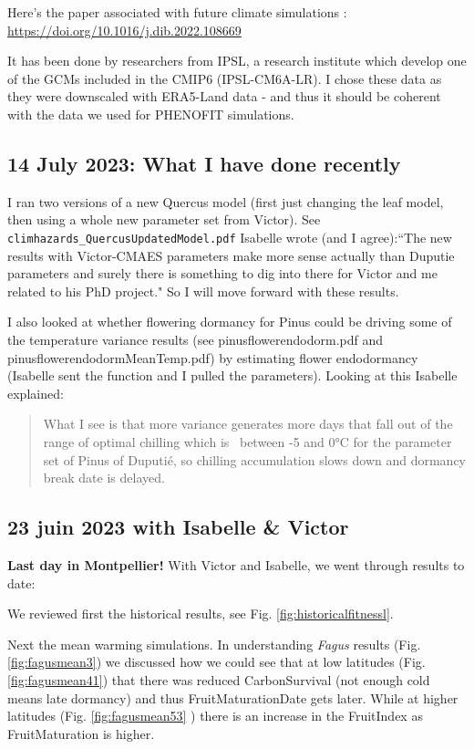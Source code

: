 \documentclass[11pt,letter]{article}
\begin{document}
Here's the paper associated with future climate simulations : \url{https://doi.org/10.1016/j.dib.2022.108669}

It has been done by researchers from IPSL, a research institute which develop one of the GCMs included in the CMIP6 (IPSL-CM6A-LR).
I chose these data as they were downscaled with ERA5-Land data - and thus it should be coherent with the data we used for PHENOFIT simulations.

\subsection{14 July 2023: What I have done recently}
I ran two versions of a new Quercus model (first just changing the leaf model, then using a whole new parameter set from Victor). See \verb|climhazards_QuercusUpdatedModel.pdf| Isabelle wrote (and I agree):``The new results with Victor-CMAES parameters make more sense actually than Duputie parameters and surely there is something to dig into there for Victor and me related to his PhD project." So I will move forward with these results. 

I also looked at whether flowering dormancy for Pinus could be driving some of the temperature variance results (see pinusflowerendodorm.pdf and pinusflowerendodormMeanTemp.pdf) by estimating flower endodormancy (Isabelle sent the function and I pulled the parameters). Looking at this Isabelle explained:

\begin{quote}
What I see is that more variance generates more days that fall out of the range of optimal chilling which is ~between -5 and 0°C for the parameter set of Pinus of Duputié, so chilling accumulation slows down and dormancy break date is delayed. 
\end{quote}


\subsection{23 juin 2023 with Isabelle \& Victor}
{\bf Last day in Montpellier!} With Victor and Isabelle, we went through results to date:

We reviewed first the historical results, see Fig. \ref{fig:historicalfitnessl}. 

Next the mean warming simulations. In understanding \emph{Fagus} results (Fig. \ref{fig:fagusmean3}) we discussed how we could see that at low latitudes (Fig. \ref{fig:fagusmean41}) that there was reduced CarbonSurvival (not enough cold means late dormancy) and thus FruitMaturationDate gets later. While at higher latitudes (Fig. \ref{fig:fagusmean53} ) there is an increase in the FruitIndex as FruitMaturation is higher. 
\end{document}
